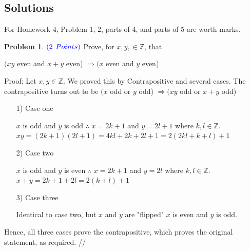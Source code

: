 \documentclass[letterpaper, 12pt]{article}
\newcommand{\hw}{4} %
\theoremstyle{definition}
\newtheorem{pb}{Problem} %
\begin{document}
\subsection*{Solutions}
For Homework \hw, Problem 1, 2, parts of 4, and parts of 5 are worth marks.
\begin{spacing}{1.33}


\vspace{5mm}
\setcounter{pb}{0}
\begin{pb} 


    $\color{blue}{(2}$ $\color{blue}{Points)}$ Prove, for $x, y, \in \mathbb{Z}$, that
    \begin{center}
        $(xy$ even and $x + y$ even) $\Longrightarrow (x$ even and $y$ even)
    \end{center}  
    


    Proof: Let $x, y \in \mathbb{Z}$. We proved this by Contrapositive and several cases. The \newline \indent contrapositive turns out to be $(x$ odd or $y$ odd) $\Longrightarrow (xy$ odd or $x+y$ odd)
    \begin{itemize}
        \item[1)] Case one 

            {\centering $x$ is odd and $y$ is odd $\therefore$ $x = 2k + 1$ and $y = 2l + 1$ where $k, l \in \mathbb{Z}$.
            $xy = (2k+1)(2l+1) = 4kl + 2k + 2l + 1 = 2(2kl + k + l )+1$\par}
            
        \item[2)] Case two

            {\centering $x$ is odd and $y$ is even $\therefore$ $x = 2k + 1$ and $y = 2l$ where $k, l \in \mathbb{Z}$. 
            $x + y = 2k + 1 + 2l = 2 (k + l) + 1$ \par}
            
        \item[3)] Case three
        
            {\centering Identical to case two, but $x$ and $y$ are "flipped" $x$ is even and $y$ is odd.\par}
    \end{itemize}

    Hence, all three cases prove the contrapositive, which proves the original statement, as required. //

\end{pb}



\end{spacing}
\end{document}
